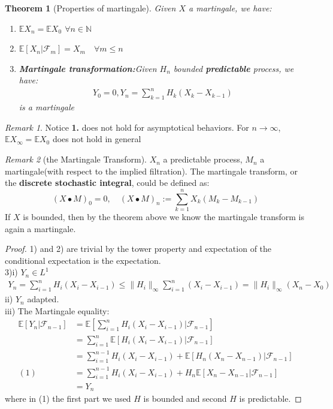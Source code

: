 \documentclass[a4paper,11pt]{book}
\newtheorem{theorem}{Theorem}[section]
\theoremstyle{definition}
\theoremstyle{remark}
\newtheorem*{remark}{Remark}
\begin{document}
\begin{theorem}[Properties of martingale]
	Given $X$ a martingale, we have:
	\begin{enumerate}
		\item $\mathbb{E} X_n = \mathbb{E} X_0$ $ \forall n \in \mathbb{N}$
		\item $\mathbb{E}[X_n |\mathcal{F}_m] = X_m \quad \forall m \leq n$
		\item \textbf{Martingale transformation:}Given $H_n$ bounded \textbf{predictable} process, we have:
		\begin{align*}
			Y_0 = 0, Y_n = \sum_{k = 1}^n H_k(X_k - X_{k-1})
		\end{align*}
		is a martingale 
	\end{enumerate}
\end{theorem}
\begin{remark}
Notice \textbf{1.} does not hold for asymptotical behaviors. For $n \rightarrow \infty$, $\mathbb{E}X_\infty = \mathbb{E}X_0$ does not hold in general
\end{remark}
\begin{remark}[the Martingale Transform]
$X_n$ a predictable process, $M_n$ a martingale(with respect to the implied filtration). The martingale transform, or the \textbf{discrete stochastic integral}, could be defined as:
\begin{equation*}
	(X\bullet M)_0 = 0, \quad (X \bullet M)_n := \sum_{k = 1}^n X_k(M_k - M_{k-1}) 
\end{equation*}
If $X$ is bounded, then by the theorem above we know the martingale transform is again a martingale.
\end{remark}
\begin{proof}
	1) and 2) are trivial by the tower property and expectation of the conditional expectation is the expectation.\\
	3)i) $Y_n \in L^1$
	\begin{align*}
		Y_n = \sum_{i = 1}^n H_i(X_i - X_{i-1}) \leq \|H_i\|_\infty \sum_{i = 1}^n(X_i - X_{i-1}) = \|H_i\|_\infty (X_n - X_0)
	\end{align*} 
	ii) $Y_n$ adapted.\\
	iii) The Martingale equality:
	\begin{align*}
		\mathbb{E}[Y_n | \mathcal{F}_{n-1}] &= \mathbb{E}[\sum_{i = 1}^nH_i(X_i - X_{i -1})|\mathcal{F}_{n-1}]\\
		&= \sum_{i = 1}^n \mathbb{E}[H_i(X_i - X_{i-1})|\mathcal{F}_{n-1}]\\
		&= \sum_{i = 1}^{n-1} H_i(X_i - X_{i -1}) +  \mathbb{E}[H_n(X_n - X_{n -1})| \mathcal{F}_{n-1}]\\
	(1)	&= \sum_{i = 1}^{n-1} H_i(X_i - X_{i -1}) + H_n\mathbb{E}[X_n - X_{n-1}|\mathcal{F}_{n-1}] \\
		&= Y_n
	\end{align*}
	where in (1) the first part we used $H$ is bounded and second $H$ is predictable.
\end{proof}
\end{document}
